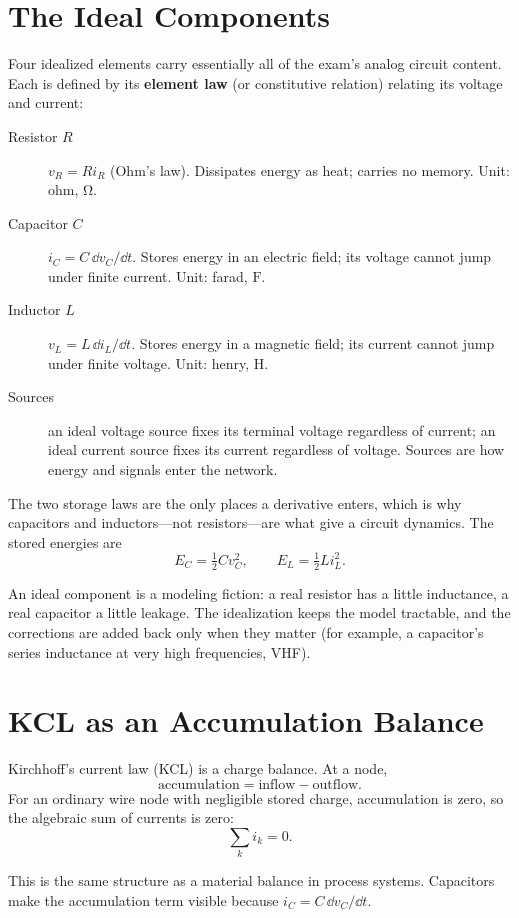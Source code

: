 \section{The Ideal Components}
Four idealized elements carry essentially all of the exam's analog circuit
content. Each is defined by its \textbf{element law} (or constitutive relation)
relating its voltage and current:
\begin{description}
\item[Resistor \(R\)] \(v_R=Ri_R\) (Ohm's law). Dissipates energy as heat;
carries no memory. Unit: ohm, \(\si{\ohm}\).
\item[Capacitor \(C\)] \(i_C=C\,\dd v_C/\dd t\). Stores energy in an electric
field; its voltage cannot jump under finite current. Unit: farad, \(\si{\farad}\).
\item[Inductor \(L\)] \(v_L=L\,\dd i_L/\dd t\). Stores energy in a magnetic
field; its current cannot jump under finite voltage. Unit: henry, \(\si{\henry}\).
\item[Sources] an ideal voltage source fixes its terminal voltage regardless of
current; an ideal current source fixes its current regardless of voltage. Sources
are how energy and signals enter the network.
\end{description}
The two storage laws are the only places a derivative enters, which is why
capacitors and inductors---not resistors---are what give a circuit dynamics. The
stored energies are
\[
E_C=\tfrac{1}{2}Cv_C^2,\qquad
E_L=\tfrac{1}{2}Li_L^2.
\]

\begin{physicalbox}
An ideal component is a modeling fiction: a real resistor has a little
inductance, a real capacitor a little leakage. The idealization keeps the model
tractable, and the corrections are added back only when they matter (for example,
a capacitor's series inductance at very high frequencies, VHF).
\end{physicalbox}

\section{KCL as an Accumulation Balance}
Kirchhoff's current law (KCL) is a charge balance. At a node,
\[
\text{accumulation}=\text{inflow}-\text{outflow}.
\]
For an ordinary wire node with negligible stored charge, accumulation is zero,
so the algebraic sum of currents is zero:
\[
\sum_k i_k=0.
\]

\begin{controlsbox}
This is the same structure as a material balance in process systems. Capacitors
make the accumulation term visible because \(i_C=C\,\dd v_C/\dd t\).
\end{controlsbox}

